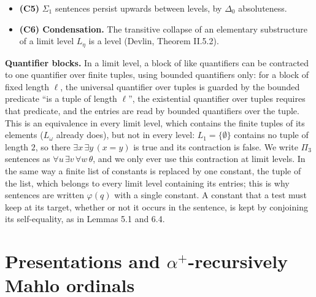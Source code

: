 \documentclass[11pt]{article}
\begin{document}
\begin{itemize}
  \begin{proof}[Self-contained proof of (C4)]
  To see that they define truth, let $L_{\beta} \models G$. By (C3), any such arguments in $L_{\beta}$ lie in $L_{\nu}$
  for some $\nu < \beta$, a certificate through $\nu$ is an element of $L_{\beta}$, and every certificate in $L_{\beta}$
  is the true one; and by $\Delta_0$ absoluteness $\theta$ is true of them in $L_{\nu}$ if and only if it is true of
  them in $L_{\beta}$. So for a valid code, the bracket of $\Sat_2$ holds in $L_{\beta}$ for some $\nu, W$ exactly when
  $L_{\beta} \models \theta(x, y, q)$, and the bracket of $\Sat_3$ holds for all $\nu, W$ exactly when
  $L_{\beta} \models \theta(u, v, w, q)$. For an invalid code the first bracket fails for all $\nu, W$ and the second
  for some, so both formulas are false.
  \end{proof}
\item \textbf{(C5)} $\Sigma_1$ sentences persist upwards between levels, by $\Delta_0$ absoluteness.
\item \textbf{(C6) Condensation.} The transitive collapse of an elementary substructure of a limit level $L_{\eta}$ is a
  level (Devlin, Theorem II.5.2).
\end{itemize}

\textbf{Quantifier blocks.} In a limit level, a block of like quantifiers can be contracted to one quantifier over
finite tuples, using bounded quantifiers only: for a block of fixed length $\ell$, the universal quantifier over
tuples is guarded by the bounded predicate ``is a tuple of length $\ell$'', the existential quantifier over tuples
requires that predicate, and the entries are read by bounded quantifiers over the tuple. This is an equivalence in
every limit level, which contains the finite tuples of its elements ($L_{\omega}$ already does), but not in every
level: $L_1 = \{\emptyset\}$ contains no tuple of length $2$, so there $\exists x\, \exists y\, (x = y)$ is true and
its contraction is false. We write $\Pi_3$ sentences as
$\forall u\, \exists v\, \forall w\, \theta$, and we only ever use this contraction at limit levels. In the same way
a finite list of constants is replaced by one constant, the tuple of the list, which belongs to every limit level
containing its entries; this is why sentences are written $\varphi(q)$ with a single constant. A constant that a test
must keep at its target, whether or not it occurs in the sentence, is kept by conjoining its self-equality, as in
Lemmas 5.1 and 6.4.

\section{Presentations and \texorpdfstring{$\alpha^+$}{alpha+}-recursively Mahlo ordinals}
\end{document}
